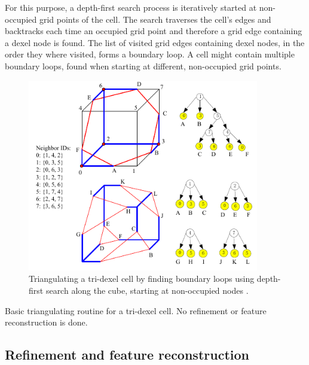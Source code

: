 For this purpose, a depth-first search process is iteratively started at non-occupied grid points of the cell.
The search traverses the cell's edges and backtracks each time an occupied grid point and therefore a grid edge containing a dexel node is found.
The list of visited grid edges containing dexel nodes, in the order they where visited, forms a boundary loop.
A cell might contain multiple boundary loops, found when starting at different, non-occupied grid points.

\begin{figure}
	\centering
	\includegraphics[width=0.9\textwidth]{images/tri_dexel_triangulation}
	\caption{
		Triangulating a tri-dexel cell by finding boundary loops using depth-first search along the cube, starting at non-occupied nodes \cite{tridexel_reconstruction}.
	}
	\label{fig:tri_dexel_triangulation}
\end{figure}

\begin{algorithm}
	\centering
	\begin{algorithmic}[1]
		
		\EndFunction
	\end{algorithmic}
	\caption{
		Basic triangulating routine for a tri-dexel cell.
		No refinement or feature reconstruction is done.
	}
	\label{alg:tri_dexel_triangulation}
\end{algorithm}

\subsection{Refinement and feature reconstruction}
\label{sec:tri_dexel_refinement}

